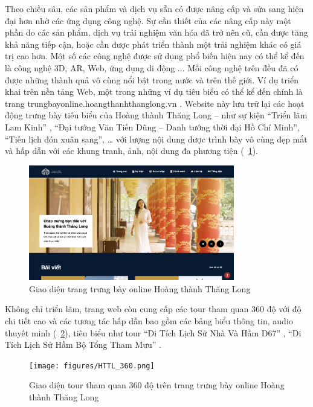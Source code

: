 Theo chiều sâu, các sản phẩm và dịch vụ sẵn có được nâng cấp và sửa sang hiện
đại hơn nhờ các ứng dụng công nghệ. Sự cần thiết của các nâng cấp này một phần do
các sản phẩm, dịch vụ trải nghiệm văn hóa đã trở nên cũ, cần được tăng khả năng tiếp
cận, hoặc cần được phát triển thành một trải nghiệm khác có giá trị cao hơn.
Một số các công nghệ được sử dụng phổ biến hiện nay có thể kể đến là công nghệ
3D, AR, Web, ứng dụng di động ... Mỗi công nghệ trên đều đã có được những thành
quả vô cùng nổi bật trong nước và trên thế giới. Ví dụ triển khai trên nền tảng Web,
một trong những ví dụ tiêu biểu có thể kể đến chính là trang
trungbayonline.hoangthanhthanglong.vn \cite{hoangthanh2022}. Website này lưu trữ lại các hoạt động
trưng bày tiêu biểu của Hoàng thành Thăng Long – như sự kiện “Triển lãm Lam
Kinh” \cite{lamkinh2022}, “Đại tướng Văn Tiến Dũng – Danh tướng thời đại Hồ Chí Minh”\cite{vantien2022}, “Tiến
lịch đón xuân sang”\cite{tetviet2022}, … với lượng nội dung được trình bày vô cùng đẹp mắt và
hấp dẫn với các khung tranh, ảnh, nội dung đa phương tiện (\figurename~\ref{HTTL}).

\begin{figure}[h]
    \centering
    \includegraphics[width=0.8\textwidth]{figures/HTTL.png} %
    \caption{Giao diện trang trưng bày online Hoàng thành Thăng Long}
    \label{HTTL}
\end{figure}

Không chỉ triển lãm, trang web còn cung cấp các tour tham quan 360 độ với
độ chi tiết cao và các tương tác hấp dẫn bao gồm các bảng biểu thông tin, audio thuyết
minh (\figurename~\ref{HTTL_360}), tiêu biểu như tour “Di Tích Lịch Sử Nhà Và Hầm D67” \cite{d67_2022}, “Di
Tích Lịch Sử Hầm Bộ Tổng Tham Mưu” \cite{bttm2022}.

\begin{figure}[h]
    \centering
    \texttt{[image: figures/HTTL\_360.png]} %
    \caption{Giao diện tour tham quan 360 độ trên trang trưng bày online Hoàng thành Thăng Long}
    \label{HTTL_360}
\end{figure}

